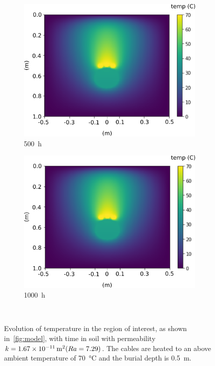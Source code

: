 \documentclass[Journal,letterpaper,InsideFigs]{ascelike-new}
\begin{document}
\begin{figure}[ht]
\begin{subfigure}[b]{0.49\textwidth}
    \includegraphics[width=\textwidth]{figs/time-evol/500h.png}
    \caption{\SI{500}{\hour}}
    \label{fig:500}
 \end{subfigure}             
 \begin{subfigure}[b]{0.49\textwidth}
    \includegraphics[width=\textwidth]{figs/time-evol/1000h.png}
    \caption{\SI{1000}{\hour}}
    \label{fig:1000}
 \end{subfigure}  \\
 
 \caption{Evolution of temperature in the region of interest, as shown in~\cref{fig:model},
   with time in soil with permeability $k = \SI{1.67E-11}{\meter\squared} (Ra = 7.29)$. The cables are heated to an above ambient temperature of \SI{70}{\celsius} and the burial depth is \SI{0.5}{\meter}.}
 \label{fig:time-evol}
\end{figure}
\end{document}
